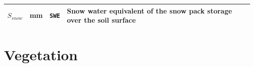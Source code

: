 \documentclass[]{book}
\begin{document}
\begin{longtable}[]{@{}llll@{}}
\begin{minipage}[t]{0.11\columnwidth}
\(S_{snow}\)\strut
\end{minipage} & \begin{minipage}[t]{0.10\columnwidth}\raggedright
mm\strut
\end{minipage} & \begin{minipage}[t]{0.12\columnwidth}\raggedright
\texttt{SWE}\strut
\end{minipage} & \begin{minipage}[t]{0.45\columnwidth}\raggedright
Snow water equivalent of the snow pack storage over the soil surface\strut
\end{minipage}\tabularnewline
\bottomrule
\end{longtable}

\hypertarget{vegetation}{%
\section{Vegetation}\label{vegetation}}
\end{document}

